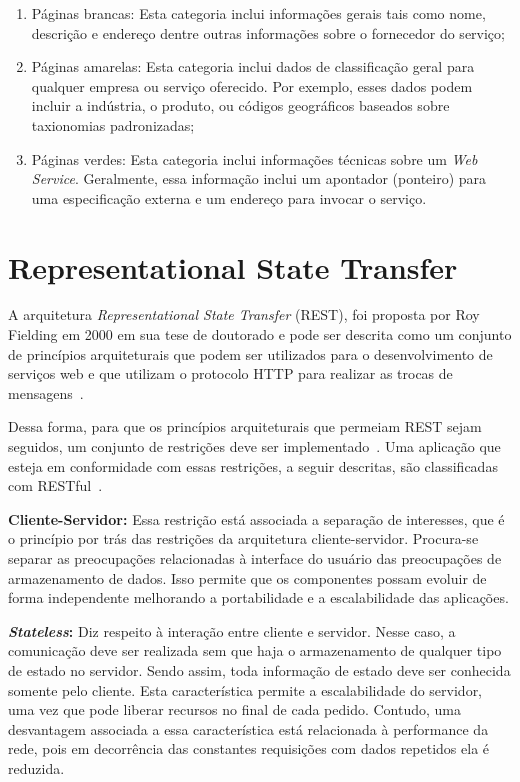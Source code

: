 \begin{enumerate}[a )]
	\item Páginas brancas: Esta categoria inclui informações gerais tais como nome, descrição e endereço dentre outras informações sobre o fornecedor do serviço;

	\item Páginas amarelas: Esta categoria inclui dados de classificação geral para qualquer empresa ou serviço oferecido. Por exemplo, esses dados podem incluir a indústria, o produto, ou códigos geográficos baseados sobre taxionomias padronizadas;

	\item Páginas verdes: Esta categoria inclui informações técnicas sobre um \emph{Web Service}. Geralmente, essa informação inclui um apontador (ponteiro) para uma especificação externa e um endereço para invocar o serviço.

\end{enumerate}

\section{Representational State Transfer}\label{sec:rest}
A arquitetura \emph{Representational State Transfer} (REST), foi proposta por Roy Fielding em
2000 em sua tese de doutorado e pode ser descrita como um conjunto de princípios arquiteturais que podem ser utilizados para o desenvolvimento de serviços web e que utilizam o protocolo HTTP para realizar as trocas de mensagens~\cite{Fielding2000}.

Dessa forma, para que os princípios arquiteturais que permeiam REST sejam seguidos, um conjunto de restrições deve ser implementado~\cite{Fielding2000}. Uma aplicação que esteja em conformidade com essas restrições, a seguir descritas, são classificadas com RESTful~\cite{Richardson2007}.

\textbf{Cliente-Servidor:} Essa restrição está associada a separação de interesses, que é o princípio por trás das restrições da arquitetura cliente-servidor. Procura-se separar as preocupações relacionadas à interface do usuário das preocupações de armazenamento de dados. Isso permite que os componentes possam evoluir de forma independente melhorando a portabilidade e a escalabilidade das aplicações.

\textbf{\emph{Stateless}:} Diz respeito à interação entre cliente e servidor. Nesse caso, a  comunicação deve ser realizada sem que haja o armazenamento de qualquer tipo de estado no servidor. Sendo assim,  toda informação de estado deve ser conhecida somente pelo cliente.  Esta característica permite a escalabilidade do servidor, uma vez que pode liberar recursos no final de cada pedido.
Contudo, uma desvantagem associada a essa característica  está relacionada à performance da rede, pois em decorrência das constantes requisições com dados repetidos  ela é reduzida.

